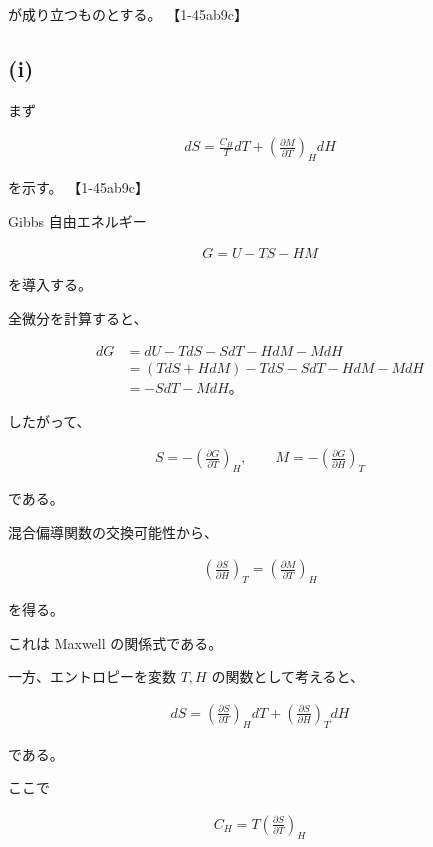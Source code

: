\documentclass[platex,dvipdfmx,a4paper]{jsarticle}
\begin{document}
が成り立つものとする。 【1-45ab9c】

\subsection{(i)}

まず

\begin{align*}
dS
=
\frac{C_H}{T}dT
+
\left(
\frac{\partial M}{\partial T}
\right)_H dH
\end{align*}

を示す。 【1-45ab9c】

Gibbs 自由エネルギー

\begin{align*}
G=U-TS-HM
\end{align*}

を導入する。

全微分を計算すると、

\begin{align*}
dG
&=
dU-TdS-SdT-HdM-MdH \\
&=
(TdS+HdM)-TdS-SdT-HdM-MdH \\
&=
-SdT-MdH。
\end{align*}

したがって、

\begin{align*}
S
=
-\left(
\frac{\partial G}{\partial T}
\right)_H,
\qquad
M
=
-\left(
\frac{\partial G}{\partial H}
\right)_T
\end{align*}

である。

混合偏導関数の交換可能性から、

\begin{align*}
\left(
\frac{\partial S}{\partial H}
\right)_T
=
\left(
\frac{\partial M}{\partial T}
\right)_H
\end{align*}

を得る。

これは Maxwell の関係式である。

一方、エントロピーを変数 $T,H$ の関数として考えると、

\begin{align*}
dS
=
\left(
\frac{\partial S}{\partial T}
\right)_H dT
+
\left(
\frac{\partial S}{\partial H}
\right)_T dH
\end{align*}

である。

ここで

\begin{align*}
C_H
=
T
\left(
\frac{\partial S}{\partial T}
\right)_H
\end{align*}
\end{document}
